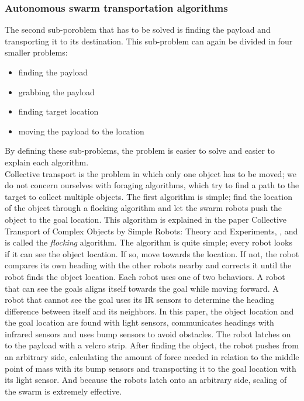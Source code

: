 \subsubsection{Autonomous swarm transportation algorithms}
The second sub-poroblem that has to be solved is finding the payload and transporting it to its destination.
This sub-problem can again be divided in four smaller problems:

\begin{itemize}
	\item finding the payload
	\item grabbing the payload
	\item finding target location
	\item moving the payload to the location
\end{itemize}

By defining these sub-problems, the problem is easier to solve and easier to explain each algorithm. \\

Collective transport is the problem in which only one object has to be moved; we do not concern ourselves with foraging algorithms, which try to find a path to the target to collect multiple objects.
The first algorithm is simple; find the location of the object through a flocking algorithm and let the swarm robots push the object to the goal location. 
This algorithm is explained in the paper Collective Transport of Complex Objects by Simple Robots: Theory and Experiments, \cite{Rubenstein2013}, and is called the \emph{flocking} algorithm.
The algorithm is quite simple; every robot looks if it can see the object location. If so, move towards the location. If not, the robot compares its own heading with the other robots nearby and corrects it until the robot finds the object location.
Each robot uses one of two behaviors.
 A robot that can see the goals aligns itself towards the goal while moving forward.
 A robot that cannot see the goal uses its IR sensors to determine the heading difference between itself and its neighbors.
 In this paper, the object location and the goal location are found with light sensors, communicates headings with infrared sensors and uses bump sensors to avoid obstacles. 
The robot latches on to the payload with a velcro strip.
After finding the object, the robot pushes from an arbitrary side, calculating the amount of force needed in relation to the middle point of mass with its bump sensors and transporting it to the goal location with its light sensor.  
And because the robots latch onto an arbitrary side, scaling of the swarm is extremely effective. \\ 

